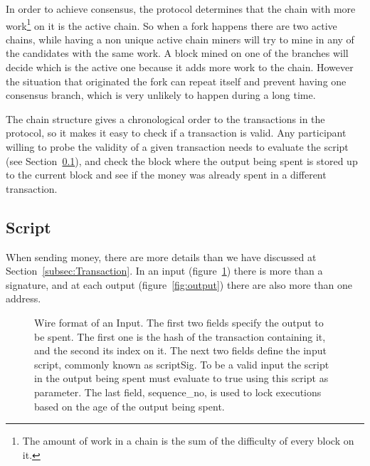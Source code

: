 In order to achieve consensus, the protocol determines that the chain with
  more work\footnote{The amount of work in a chain is the sum of the difficulty
  of every block on it.} on it is the active chain.
So when a fork happens there are two active chains, while having a non unique
  active chain miners will try to mine in any of the candidates with the same
  work.
A block mined on one of the branches will decide which is the active one
  because it adds more work to the chain. However the situation that originated
  the fork can repeat itself and prevent having one consensus branch, which is
  very unlikely \cite{decker2013information} to happen during a long time.

The chain structure gives a chronological order to the transactions in the
  protocol, so it makes it easy to check if a transaction is valid.
Any participant willing to probe the validity of a given transaction needs
  to evaluate the script (see Section~\ref{subsec:script}), and  check the block
  where the output being spent is stored up to the current block and see if the
  money was already spent in a different transaction.

  \subsection{Script} \label{subsec:script}

When sending money, there are more details than we have discussed at
  Section~\ref{subsec:Transaction}. In an input (figure~\ref{fig:input}) there
  is more than a signature, and at each output (figure~\ref{fig:output}) there
  are also more than one address.

\begin{figure}[ht]
  \centering
  
  \caption[Wire format of an Input.]{Wire format of an Input.
             The first two fields specify the output to be spent.
             The first one is the hash of the transaction containing it, and the
               second its index on it.
             The next two fields define the input script, commonly known as
               scriptSig.
             To be a valid input the script in the output being spent must
               evaluate to true using this script as parameter.
             The last field, sequence\_no, is used to lock executions based on
             the age of the output being spent.
         }
  \label{fig:input}
\end{figure}

